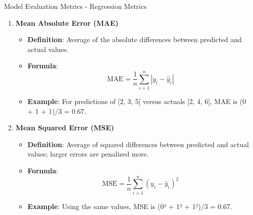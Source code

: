 \documentclass[aspectratio=169]{beamer}
\begin{document}
\begin{frame}[fragile]{Model Evaluation Metrics - Regression Metrics}
    \begin{enumerate}
        \item \textbf{Mean Absolute Error (MAE)}
        \begin{itemize}
            \item \textbf{Definition}: Average of the absolute differences between predicted and actual values.
            \item \textbf{Formula}: 
            \begin{equation}
            \text{MAE} = \frac{1}{n} \sum_{i=1}^n |y_i - \hat{y}_i|
            \end{equation}
            \item \textbf{Example}: For predictions of [2, 3, 5] versus actuals [2, 4, 6], MAE is (0 + 1 + 1)/3 = 0.67.
        \end{itemize}
        
        \item \textbf{Mean Squared Error (MSE)}
        \begin{itemize}
            \item \textbf{Definition}: Average of squared differences between predicted and actual values; larger errors are penalized more.
            \item \textbf{Formula}: 
            \begin{equation}
            \text{MSE} = \frac{1}{n} \sum_{i=1}^n (y_i - \hat{y}_i)^2
            \end{equation}
            \item \textbf{Example}: Using the same values, MSE is (0² + 1² + 1²)/3 = 0.67.
        \end{itemize}
    \end{enumerate}
\end{frame}
\end{document}
